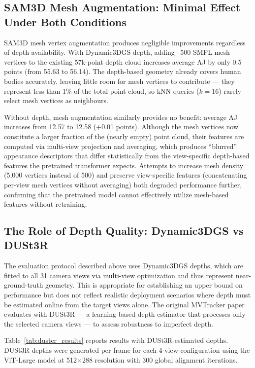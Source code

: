 \documentclass[12pt, a4paper, oneside]{report}
\begin{document}
\subsection{SAM3D Mesh Augmentation: Minimal Effect Under Both Conditions}
SAM3D mesh vertex augmentation produces negligible improvements regardless of depth availability. With Dynamic3DGS depth, adding ~500 SMPL mesh vertices to the existing 57k-point depth cloud increases average AJ by only 0.5 points (from 55.63 to 56.14). The depth-based geometry already covers human bodies accurately, leaving little room for mesh vertices to contribute --- they represent less than 1\% of the total point cloud, so kNN queries ($k=16$) rarely select mesh vertices as neighbours.

Without depth, mesh augmentation similarly provides no benefit: average AJ increases from 12.57 to 12.58 (+0.01 points). Although the mesh vertices now constitute a larger fraction of the (nearly empty) point cloud, their features are computed via multi-view projection and averaging, which produces ``blurred'' appearance descriptors that differ statistically from the view-specific depth-based features the pretrained transformer expects. Attempts to increase mesh density (5,000 vertices instead of 500) and preserve view-specific features (concatenating per-view mesh vertices without averaging) both degraded performance further, confirming that the pretrained model cannot effectively utilize mesh-based features without retraining.

\subsection{The Role of Depth Quality: Dynamic3DGS vs DUSt3R}
\label{sec:duster_results}
The evaluation protocol described above uses Dynamic3DGS depths, which are fitted to all 31 camera views via multi-view optimization and thus represent near-ground-truth geometry. This is appropriate for establishing an upper bound on performance but does not reflect realistic deployment scenarios where depth must be estimated online from the target views alone. The original MVTracker paper evaluates with DUSt3R \cite{wang2024dust3rgeometric3dvision} --- a learning-based depth estimator that processes only the selected camera views --- to assess robustness to imperfect depth.

Table~\ref{tab:duster_results} reports results with DUSt3R-estimated depths. DUSt3R depths were generated per-frame for each 4-view configuration using the ViT-Large model at 512$\times$288 resolution with 300 global alignment iterations.
\end{document}
